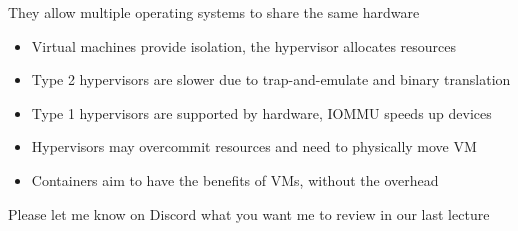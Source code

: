   \begin{slide}
    

    They allow multiple operating systems to share the same hardware

    \begin{itemize}
      \item Virtual machines provide isolation, the hypervisor allocates
            resources
      \item Type 2 hypervisors are slower due to trap-and-emulate and binary
            translation
      \item Type 1 hypervisors are supported by hardware, IOMMU speeds up devices
      \item Hypervisors may overcommit resources and need to physically move VM
      \item Containers aim to have the benefits of VMs, without the overhead
    \end{itemize}

  \end{slide}

  \begin{slide}


    Please let me know on Discord what you want me to review in our last lecture

  \end{slide}


